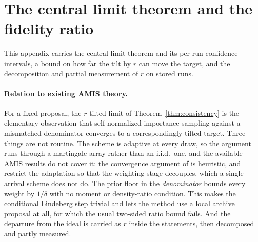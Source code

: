 \documentclass[10pt]{article}
\theoremstyle{plain}
\theoremstyle{definition}
\begin{document}




\appendix

\section{The central limit theorem and the fidelity ratio}\label{app:theory-more}
This appendix carries the central limit theorem and its per-run confidence intervals, a bound on how far the tilt by $r$ can move the target, and the decomposition and partial measurement of $r$ on stored runs.

\paragraph{Relation to existing AMIS theory.} For a fixed proposal, the $r$-tilted limit of Theorem~\ref{thm:consistency} is the elementary observation that self-normalized importance sampling against a mismatched denominator converges to a correspondingly tilted target. Three things are not routine. The scheme is adaptive at every draw, so the argument runs through a martingale array rather than an i.i.d.\ one, and the available AMIS results do not cover it: the convergence argument of \citet{cornuet2012amis} is heuristic, and \citet{marin2019consistency} restrict the adaptation so that the weighting stage decouples, which a single-arrival scheme does not do. The prior floor in the \emph{denominator} bounds every weight by $1/\delta$ with no moment or density-ratio condition. This makes the conditional Lindeberg step trivial and lets the method use a local archive proposal at all, for which the usual two-sided ratio bound fails. And the departure from the ideal is carried as $r$ inside the statements, then decomposed and partly measured.
\end{document}
